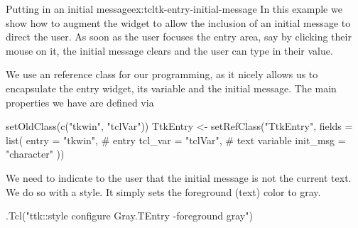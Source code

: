 

\begin{example}{Putting in an initial message}{ex:tcltk-entry-initial-message}
In this example we show how to augment the  widget
to allow the inclusion of an initial message to direct the user. As
soon as the user focuses the entry area, say by clicking their mouse
on it, the initial message clears and the user can type in their
value.

We use an \R{} reference class for our programming, as it nicely
allows us to encapsulate the entry widget, its \TCL{} variable and the
initial message. The main properties we have are defined via


\begin{Schunk}
\begin{Sinput}
 setOldClass(c("tkwin", "tclVar"))
 TtkEntry <- setRefClass("TtkEntry",
                         fields = list(
                           entry = "tkwin",     # entry
                           tcl_var  = "tclVar", # text variable
                           init_msg = "character"
                           ))
\end{Sinput}
\end{Schunk}
%

We need to indicate to the user that the initial message is not the
current text. We do so with a style. It simply sets the foreground
(text) color to gray.

\begin{Schunk}
\begin{Sinput}
 .Tcl("ttk::style configure Gray.TEntry -foreground gray") 
\end{Sinput}
\end{Schunk}


\end{example}
